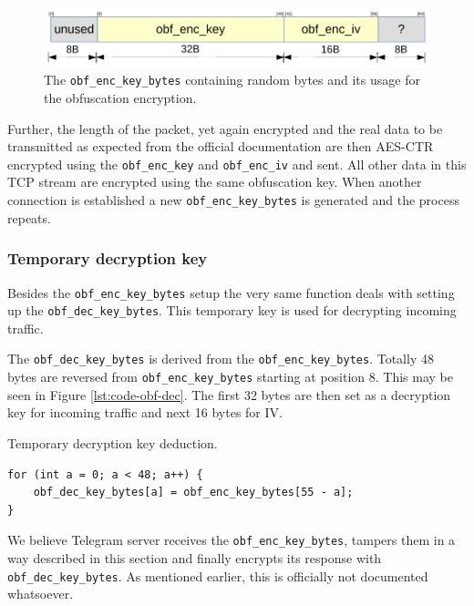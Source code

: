 \documentclass[thesis=M,english]{FITthesis}[2012/10/20]
\begin{document}
\begin{figure}[htb]
	\centering
	\includegraphics[width=1\textwidth]{bytes-sent.pdf}
	\caption{The \texttt{obf\_enc\_key\_bytes} containing random bytes and its usage for the obfuscation encryption.}
	\label{img:code-obfuscation-bytes-sent}
\end{figure}

Further, the length of the packet, yet again encrypted and the real data to be transmitted as expected from the official documentation are then AES-CTR encrypted using the \texttt{obf\_enc\_key} and \texttt{obf\_enc\_iv} and sent. All other data in this TCP stream are encrypted using the same obfuscation key. When another connection is established a new \texttt{obf\_enc\_key\_bytes} is generated and the process repeats.

\subsubsection{Temporary decryption key}

Besides the \texttt{obf\_enc\_key\_bytes} setup the very same function deals with setting up the \texttt{obf\_dec\_key\_bytes}. This temporary key is used for decrypting incoming traffic.

The \texttt{obf\_dec\_key\_bytes} is derived from the \texttt{obf\_enc\_key\_bytes}. Totally 48 bytes are reversed from \texttt{obf\_enc\_key\_bytes} starting at position 8. This may be seen in Figure \ref{lst:code-obf-dec}. The first 32 bytes are then set as a decryption key for incoming traffic and next 16 bytes for IV.

\begin{listing}[htb]
\caption{Temporary decryption key deduction.}
\label{lst:code-obf-dec}
\begin{verbatim}
for (int a = 0; a < 48; a++) {
    obf_dec_key_bytes[a] = obf_enc_key_bytes[55 - a];
}
\end{verbatim}
\end{listing}

We believe Telegram server receives the \texttt{obf\_enc\_key\_bytes}, tampers them in a way described in this section and finally encrypts its response with \texttt{obf\_dec\_key\_bytes}. As mentioned earlier, this is officially not documented whatsoever.
\end{document}
